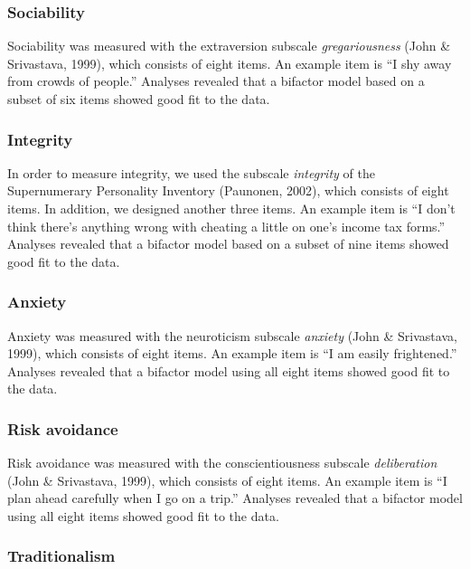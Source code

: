 \documentclass[man,floatsintext]{apa6}
\begin{document}
\hypertarget{sociability-1}{%
\subsubsection{Sociability}\label{sociability-1}}

Sociability was measured with the extraversion subscale \emph{gregariousness} (John \& Srivastava, 1999), which consists of eight items. An example item is \enquote{I shy away from crowds of people.} Analyses revealed that a bifactor model based on a subset of six items showed good fit to the data.

\hypertarget{integrity-1}{%
\subsubsection{Integrity}\label{integrity-1}}

In order to measure integrity, we used the subscale \emph{integrity} of the Supernumerary Personality Inventory (Paunonen, 2002), which consists of eight items. In addition, we designed another three items. An example item is \enquote{I don't think there's anything wrong with cheating a little on one's income tax forms.} Analyses revealed that a bifactor model based on a subset of nine items showed good fit to the data.

\hypertarget{anxiety-1}{%
\subsubsection{Anxiety}\label{anxiety-1}}

Anxiety was measured with the neuroticism subscale \emph{anxiety} (John \& Srivastava, 1999), which consists of eight items. An example item is \enquote{I am easily frightened.} Analyses revealed that a bifactor model using all eight items showed good fit to the data.

\hypertarget{risk-avoidance}{%
\subsubsection{Risk avoidance}\label{risk-avoidance}}

Risk avoidance was measured with the conscientiousness subscale \emph{deliberation} (John \& Srivastava, 1999), which consists of eight items. An example item is \enquote{I plan ahead carefully when I go on a trip.} Analyses revealed that a bifactor model using all eight items showed good fit to the data.

\hypertarget{traditionalism}{%
\subsubsection{Traditionalism}\label{traditionalism}}
\end{document}
